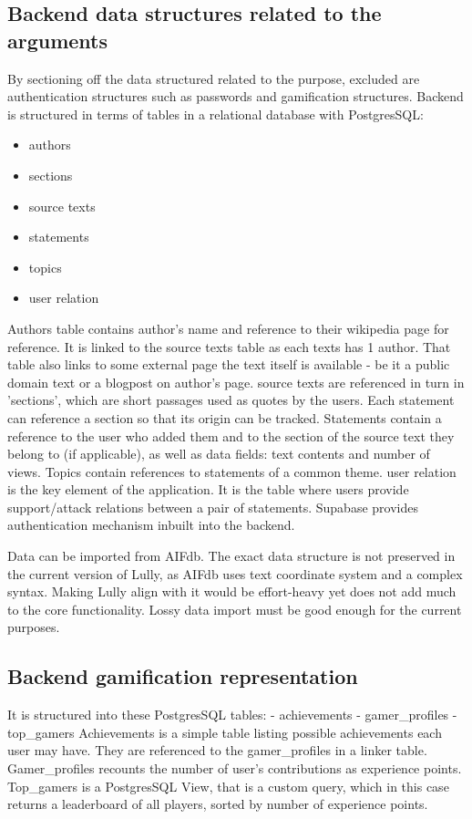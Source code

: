 \documentclass{article}
\begin{document}
\subsection{Backend data structures related to the arguments}
By sectioning off the data structured related to the purpose, excluded are authentication structures such as passwords and gamification structures.
Backend is structured in terms of tables in a relational database with PostgresSQL:
\begin{itemize}
  \item authors
  \item sections
  \item source texts
  \item statements
  \item topics
  \item user relation
\end{itemize}
Authors table contains author's name and reference to their wikipedia page for reference. It is linked to the source texts table as each texts has 1 author. That table also links to some external page the text itself is available - be it a public domain text or a blogpost on author's page. source texts are referenced in turn in 'sections', which are short passages used as quotes by the users.
Each statement can reference a section so that its origin can be tracked. Statements contain a reference to the user who added them and to the section of the source text they belong to (if applicable), as well as data fields: text contents and number of views. Topics contain references to statements of a common theme.
user relation is the key element of the application. It is the table where users provide support/attack relations between a pair of statements. 
Supabase provides authentication mechanism inbuilt into the backend.

Data can be imported from AIFdb. The exact data structure is not preserved in the current version of Lully, as AIFdb uses text coordinate system and a complex syntax. Making Lully align with it would be effort-heavy yet does not add much to the core functionality. Lossy data import must be good enough for the current purposes.

\subsection{Backend gamification representation}

It is structured into these PostgresSQL tables:
- achievements
- gamer_profiles 
- top_gamers 
Achievements is a simple table listing possible achievements each user may have. They are referenced to the gamer_profiles in a linker table. Gamer_profiles recounts the number of user's contributions as experience points.
Top_gamers is a PostgresSQL View, that is a custom query, which in this case returns a leaderboard of all players, sorted by number of experience points.
\end{document}
